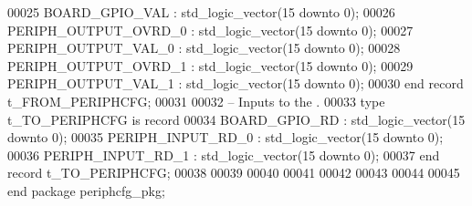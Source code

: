\begin{DoxyCode}
00025       \textcolor{vhdlchar}{BOARD_GPIO_VAL}       \textcolor{vhdlchar}{:} \textcolor{comment}{std\_logic\_vector}\textcolor{vhdlchar}{(}\textcolor{vhdllogic}{}\textcolor{vhdllogic}{15} \textcolor{keywordflow}{downto} \textcolor{vhdllogic}{}\textcolor{vhdllogic}{0}\textcolor{vhdlchar}{)};
00026       \textcolor{vhdlchar}{PERIPH_OUTPUT_OVRD_0} \textcolor{vhdlchar}{:} \textcolor{comment}{std\_logic\_vector}\textcolor{vhdlchar}{(}\textcolor{vhdllogic}{}\textcolor{vhdllogic}{15} \textcolor{keywordflow}{downto} \textcolor{vhdllogic}{}\textcolor{vhdllogic}{0}\textcolor{vhdlchar}{)};
00027       \textcolor{vhdlchar}{PERIPH_OUTPUT_VAL_0}  \textcolor{vhdlchar}{:} \textcolor{comment}{std\_logic\_vector}\textcolor{vhdlchar}{(}\textcolor{vhdllogic}{}\textcolor{vhdllogic}{15} \textcolor{keywordflow}{downto} \textcolor{vhdllogic}{}\textcolor{vhdllogic}{0}\textcolor{vhdlchar}{)};
00028       \textcolor{vhdlchar}{PERIPH_OUTPUT_OVRD_1} \textcolor{vhdlchar}{:} \textcolor{comment}{std\_logic\_vector}\textcolor{vhdlchar}{(}\textcolor{vhdllogic}{}\textcolor{vhdllogic}{15} \textcolor{keywordflow}{downto} \textcolor{vhdllogic}{}\textcolor{vhdllogic}{0}\textcolor{vhdlchar}{)};
00029       \textcolor{vhdlchar}{PERIPH_OUTPUT_VAL_1}  \textcolor{vhdlchar}{:} \textcolor{comment}{std\_logic\_vector}\textcolor{vhdlchar}{(}\textcolor{vhdllogic}{}\textcolor{vhdllogic}{15} \textcolor{keywordflow}{downto} \textcolor{vhdllogic}{}\textcolor{vhdllogic}{0}\textcolor{vhdlchar}{)}; 
00030    \textcolor{keywordflow}{end} \textcolor{keywordflow}{record} \textcolor{vhdlchar}{t_FROM_PERIPHCFG};
00031   
00032 \textcolor{keyword}{   -- Inputs to the .}
00033    \textcolor{keywordflow}{type} \textcolor{vhdlchar}{t_TO_PERIPHCFG} \textcolor{keywordflow}{is} \textcolor{keywordflow}{record}
00034       \textcolor{vhdlchar}{BOARD_GPIO_RD}        \textcolor{vhdlchar}{:} \textcolor{comment}{std\_logic\_vector}\textcolor{vhdlchar}{(}\textcolor{vhdllogic}{}\textcolor{vhdllogic}{15} \textcolor{keywordflow}{downto} \textcolor{vhdllogic}{}\textcolor{vhdllogic}{0}\textcolor{vhdlchar}{)};
00035       \textcolor{vhdlchar}{PERIPH_INPUT_RD_0}    \textcolor{vhdlchar}{:} \textcolor{comment}{std\_logic\_vector}\textcolor{vhdlchar}{(}\textcolor{vhdllogic}{}\textcolor{vhdllogic}{15} \textcolor{keywordflow}{downto} \textcolor{vhdllogic}{}\textcolor{vhdllogic}{0}\textcolor{vhdlchar}{)};
00036       \textcolor{vhdlchar}{PERIPH_INPUT_RD_1}    \textcolor{vhdlchar}{:} \textcolor{comment}{std\_logic\_vector}\textcolor{vhdlchar}{(}\textcolor{vhdllogic}{}\textcolor{vhdllogic}{15} \textcolor{keywordflow}{downto} \textcolor{vhdllogic}{}\textcolor{vhdllogic}{0}\textcolor{vhdlchar}{)};
00037    \textcolor{keywordflow}{end} \textcolor{keywordflow}{record} \textcolor{vhdlchar}{t_TO_PERIPHCFG};
00038    
00039 
00040 
00041 
00042    
00043 
00044       
00045 \textcolor{keywordflow}{end} \textcolor{keywordflow}{package} \textcolor{vhdlchar}{periphcfg\_pkg};
\end{DoxyCode}
